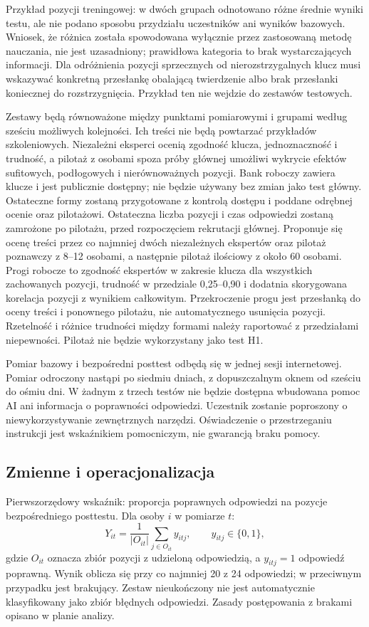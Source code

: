 \documentclass[11pt,a4paper]{article}
\begin{document}
Przykład pozycji treningowej: w dwóch grupach odnotowano różne średnie wyniki testu, ale nie podano sposobu przydziału uczestników ani wyników bazowych. Wniosek, że różnica została spowodowana wyłącznie przez zastosowaną metodę nauczania, nie jest uzasadniony; prawidłowa kategoria to brak wystarczających informacji. Dla odróżnienia pozycji sprzecznych od nierozstrzygalnych klucz musi wskazywać konkretną przesłankę obalającą twierdzenie albo brak przesłanki koniecznej do rozstrzygnięcia. Przykład ten nie wejdzie do zestawów testowych.

Zestawy będą równoważone między punktami pomiarowymi i grupami według sześciu możliwych kolejności. Ich treści nie będą powtarzać przykładów szkoleniowych. Niezależni eksperci ocenią zgodność klucza, jednoznaczność i trudność, a pilotaż z osobami spoza próby głównej umożliwi wykrycie efektów sufitowych, podłogowych i nierównoważnych pozycji. Bank roboczy zawiera klucze i jest publicznie dostępny; nie będzie używany bez zmian jako test główny. Ostateczne formy zostaną przygotowane z kontrolą dostępu i poddane odrębnej ocenie oraz pilotażowi. Ostateczna liczba pozycji i czas odpowiedzi zostaną zamrożone po pilotażu, przed rozpoczęciem rekrutacji głównej. Proponuje się ocenę treści przez co najmniej dwóch niezależnych ekspertów oraz pilotaż poznawczy z 8--12 osobami, a następnie pilotaż ilościowy z około 60 osobami. Progi robocze to zgodność ekspertów w zakresie klucza dla wszystkich zachowanych pozycji, trudność w przedziale 0,25--0,90 i dodatnia skorygowana korelacja pozycji z wynikiem całkowitym. Przekroczenie progu jest przesłanką do oceny treści i ponownego pilotażu, nie automatycznego usunięcia pozycji. Rzetelność i różnice trudności między formami należy raportować z przedziałami niepewności. Pilotaż nie będzie wykorzystany jako test H1.

Pomiar bazowy i bezpośredni posttest odbędą się w jednej sesji internetowej. Pomiar odroczony nastąpi po siedmiu dniach, z dopuszczalnym oknem od sześciu do ośmiu dni. W żadnym z trzech testów nie będzie dostępna wbudowana pomoc AI ani informacja o poprawności odpowiedzi. Uczestnik zostanie poproszony o niewykorzystywanie zewnętrznych narzędzi. Oświadczenie o przestrzeganiu instrukcji jest wskaźnikiem pomocniczym, nie gwarancją braku pomocy.

\subsection{Zmienne i operacjonalizacja}
Pierwszorzędowy wskaźnik: proporcja poprawnych odpowiedzi na pozycje bezpośredniego posttestu. Dla osoby \(i\) w pomiarze \(t\):
\[
Y_{it}=\frac{1}{|O_{it}|}\sum_{j\in O_{it}} y_{itj},
\qquad y_{itj}\in\{0,1\},
\]
gdzie \(O_{it}\) oznacza zbiór pozycji z udzieloną odpowiedzią, a \(y_{itj}=1\) odpowiedź poprawną. Wynik oblicza się przy co najmniej 20 z 24 odpowiedzi; w przeciwnym przypadku jest brakujący. Zestaw nieukończony nie jest automatycznie klasyfikowany jako zbiór błędnych odpowiedzi. Zasady postępowania z brakami opisano w planie analizy.
\end{document}
